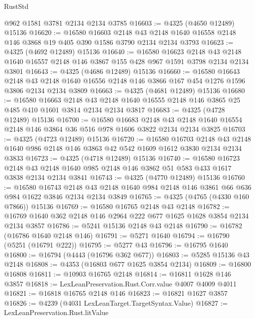 \begin{lexlean}{RustStd}
\begin{coremodule}
    @962
    @1581
    @3781
    @2134
    @2134
    @3785
@16603 := @4325 (@4650 @12489) @15136
@16620 := @16580
    @16603
    @2148
    @43
    @2148
    @1640
    @16558
    @2148
    @146
    @3868
    @19
    @405
    @390
    @1586
    @3790
    @2134
    @2134
    @3793
@16623 := @4325 (@4692 @12489) @15136
@16640 := @16580
    @16623
    @2148
    @43
    @2148
    @1640
    @16557
    @2148
    @146
    @3867
    @155
    @428
    @967
    @1591
    @3798
    @2134
    @2134
    @3801
@16643 := @4325 (@4686 @12489) @15136
@16660 := @16580
    @16643
    @2148
    @43
    @2148
    @1640
    @16556
    @2148
    @146
    @3866
    @167
    @454
    @1276
    @1596
    @3806
    @2134
    @2134
    @3809
@16663 := @4325 (@4681 @12489) @15136
@16680 := @16580
    @16663
    @2148
    @43
    @2148
    @1640
    @16555
    @2148
    @146
    @3865
    @25
    @485
    @410
    @1601
    @3814
    @2134
    @2134
    @3817
@16683 := @4325 (@4728 @12489) @15136
@16700 := @16580
    @16683
    @2148
    @43
    @2148
    @1640
    @16554
    @2148
    @146
    @3864
    @36
    @516
    @978
    @1606
    @3822
    @2134
    @2134
    @3825
@16703 := @4325 (@4723 @12489) @15136
@16720 := @16580
    @16703
    @2148
    @43
    @2148
    @1640
    @986
    @2148
    @146
    @3863
    @42
    @542
    @1609
    @1612
    @3830
    @2134
    @2134
    @3833
@16723 := @4325 (@4718 @12489) @15136
@16740 := @16580
    @16723
    @2148
    @43
    @2148
    @1640
    @985
    @2148
    @146
    @3862
    @51
    @583
    @433
    @1617
    @3838
    @2134
    @2134
    @3841
@16743 := @4325 (@4770 @12489) @15136
@16760 := @16580
    @16743
    @2148
    @43
    @2148
    @1640
    @984
    @2148
    @146
    @3861
    @66
    @636
    @984
    @1622
    @3846
    @2134
    @2134
    @3849
@16765 := @4325 (@4765 (@4330 @160 @7866)) @15136
@16769 := @16580 @16765 @2148 @43 @2148
@16782 := @16769 @1640 @362 @2148 @146 @2964 @222 @677 @1625 @1628 @3854 @2134 @2134 @3857
@16786 := @5241 @15136 @2148 @43 @2148
@16790 := @16782 (@16786 @1640 @2148 @146)
@16791 := @5271 @1640
@16794 := @16790 (@5251 (@16791 @222))
@16795 := @5277 @43
@16796 := @16795 @1640
@16800 := @16794 (@4443 (@16796 @362 @677))
@16803 := @5285 @15136 @43 @2148
@16808 := @4353 (@16803 @677 @1625 @3854 @2134)
@16809 := @16800 @16808
@16811 := @10903 @16765 @2148
@16814 := @16811 @1628 @146 @3857
@16818 := LexLeanPreservation.Rust.Corr.value @4007 @4009 @4011
@16821 := @16818 @16765 @2148 @146
@16823 := @16821 @1627 @3857
@16826 := @4239 (@4031 LexLeanTarget.TargetSyntax.Value)
@16827 := LexLeanPreservation.Rust.litValue

\end{coremodule}
\end{lexlean}
